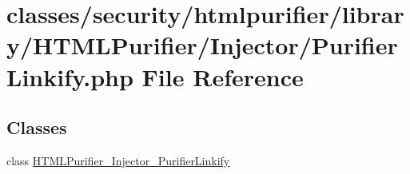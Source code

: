 \hypertarget{PurifierLinkify_8php}{\section{classes/security/htmlpurifier/library/\+H\+T\+M\+L\+Purifier/\+Injector/\+Purifier\+Linkify.php File Reference}
\label{PurifierLinkify_8php}
}
\subsection*{Classes}
\begin{DoxyCompactItemize}
\item 
class \hyperlink{classHTMLPurifier__Injector__PurifierLinkify}{H\+T\+M\+L\+Purifier\+\_\+\+Injector\+\_\+\+Purifier\+Linkify}
\end{DoxyCompactItemize}
